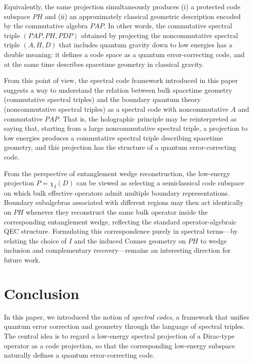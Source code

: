 \documentclass[12pt]{article}
\theoremstyle{definition} %
\theoremstyle{plain} %
\theoremstyle{remark} %
\theoremstyle{underline}
\begin{document}
Equivalently, the same projection simultaneously produces (i) a protected code subspace $PH$ and (ii) an approximately classical geometric description encoded by the commutative algebra $PAP$.
In other words, the commutative spectral triple $(PAP,PH,PDP)$ obtained by projecting the noncommutative spectral triple $(A,H,D)$ that includes quantum gravity down to low energies has a double meaning: it defines a code space as a quantum error-correcting code, and at the same time describes spacetime geometry in classical gravity.

From this point of view, the spectral code framework introduced in this paper suggests a way to understand the relation between bulk spacetime geometry (commutative spectral triples) and the boundary quantum theory (noncommutative spectral triples) as a spectral code with noncommutative $A$ and commutative $PAP$.
That is, the holographic principle may be reinterpreted as saying that, starting from a large noncommutative spectral triple, a projection to low energies produces a commutative spectral triple describing spacetime geometry, and this projection has the structure of a quantum error-correcting code.

From the perspective of entanglement wedge reconstruction, the low-energy projection $P=\chi_I(D)$ can be viewed as selecting a semiclassical code subspace on which bulk effective operators admit multiple boundary representations.
Boundary subalgebras associated with different regions may then act identically on $PH$ whenever they reconstruct the same bulk operator inside the corresponding entanglement wedge, reflecting the standard operator-algebraic QEC structure.
Formulating this correspondence purely in spectral terms—by relating the choice of $I$ and the induced Connes geometry on $PH$ to wedge inclusion and complementary recovery—remains an interesting direction for future work.




\section{Conclusion}\label{sec:conclusion}

In this paper, we introduced the notion of \emph{spectral codes}, a framework that unifies quantum error correction and geometry through the language of spectral triples.
The central idea is to regard a low-energy spectral projection of a Dirac-type operator as a code projection, so that the corresponding low-energy subspace naturally defines a quantum error-correcting code.
\end{document}
